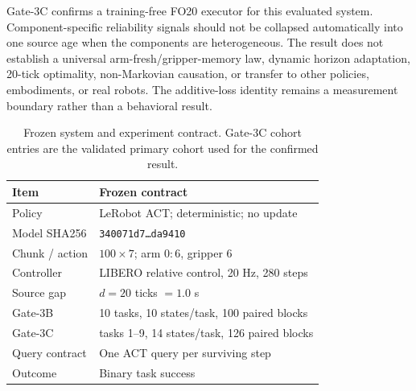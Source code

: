 Gate-3C confirms a training-free FO20 executor for this evaluated system.
Component-specific reliability signals should not be collapsed automatically
into one source age when the components are heterogeneous. The result does not
establish a universal arm-fresh/gripper-memory law, dynamic horizon adaptation,
20-tick optimality, non-Markovian causation, or transfer to other policies,
embodiments, or real robots. The additive-loss identity remains a measurement
boundary rather than a behavioral result.

\begin{table}[t]
\caption{Frozen system and experiment contract. Gate-3C cohort entries are
the validated primary cohort used for the confirmed result.}
\label{tab:system_contract}
\centering
\scriptsize
\setlength{\tabcolsep}{3.2pt}
\begin{tabular}{ll}
\toprule
Item & Frozen contract \\
\midrule
Policy & LeRobot ACT; deterministic; no update \\
Model SHA256 & \texttt{340071d7\ldots da9410} \\
Chunk / action & $100\times7$; arm $0{:}6$, gripper $6$ \\
Controller & LIBERO relative control, 20 Hz, 280 steps \\
Source gap & $d=20$ ticks $=1.0$ s \\
Gate-3B & 10 tasks, 10 states/task, 100 paired blocks \\
Gate-3C & tasks 1--9, 14 states/task, 126 paired blocks \\
Query contract & One ACT query per surviving step \\
Outcome & Binary task success \\
\bottomrule
\end{tabular}
\end{table}

